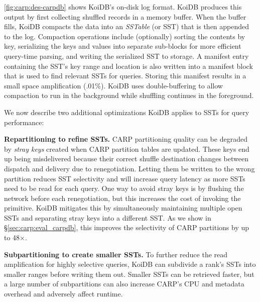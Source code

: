 \cref{fig:carp:des-carpdb} shows KoiDB's on-disk log format.
KoiDB produces this output by first collecting shuffled records in a memory buffer.
When the buffer fills, KoiDB compacts the data into an \emph{SSTable} (or SST) that is then
appended to the log.
Compaction operations include (optionally) sorting the contents by key, serializing the keys and
values into separate sub-blocks for more efficient query-time parsing, and writing the serialized
SST to storage.
A manifest entry containing the SST's key range and location is also written into a manifest block
that is used to find relevant SSTs for queries.
Storing this manifest results in a small space amplification (\mytexttilde.01\%).
KoiDB uses double-buffering to allow compaction to run in the background while shuffling continues
in the foreground.


We now describe two additional optimizations KoiDB applies to SSTs for query performance:

\textbf{Repartitioning to refine SSTs.
}
CARP partitioning quality can be degraded by \emph{stray keys} created when CARP partition tables
are updated.
These keys end up being misdelivered because their correct shuffle destination changes between
dispatch and delivery due to renegotiation.
Letting them be written to the wrong partition reduces SST selectivity and will increase query
latency as more SSTs need to be read for each query.
One way to avoid stray keys is by flushing the network before each renegotiation, but this
increases the cost of invoking the primitive.
KoiDB mitigates this by simultaneously maintaining multiple open SSTs and separating stray keys
into a different SST.
As we show in \S\ref{sec:carp:eval_carpdb}, this improves the selectivity of CARP partitions by up
to 48$\times$.


\textbf{Subpartitioning to create smaller SSTs.
}
To further reduce the read amplification for highly selective queries, KoiDB can subdivide a rank's
SSTs into smaller ranges before writing them out.
Smaller SSTs can be retrieved faster, but a large number of subpartitions can also increase CARP's
CPU and metadata overhead and adversely affect runtime.

